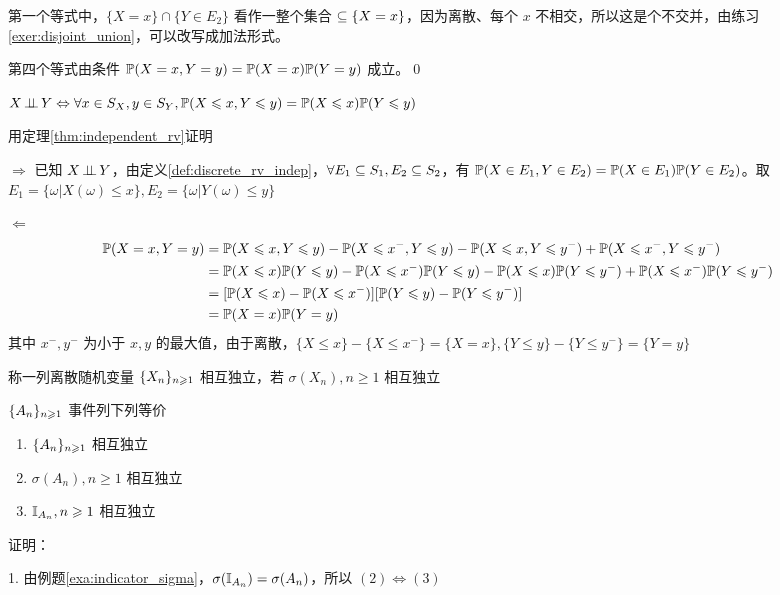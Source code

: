第一个等式中，$\{X=x\}\cap \{Y\in E_2\}$ 看作一整个集合 $\subseteq \{X=x\}$，因为离散、每个 $x$ 不相交，所以这是个不交并，由练习\ref{exer:disjoint_union}，可以改写成加法形式。

第四个等式由条件 $\mathbb{P}(X=x,Y=y)=\mathbb{P}(X=x)\mathbb{P}(Y=y)$ 成立。\qed

\begin{theorem}
    $X\operatorname{\perp\!\!\!\perp} Y\Leftrightarrow \forall x\in S_X,y\in S_Y, \mathbb{P}(X\leqslant x,Y\leqslant y)=\mathbb{P}(X\leqslant x)\mathbb{P}(Y\leqslant y)$
\end{theorem}

用定理\ref{thm:independent_rv}证明

$\Rightarrow$ 已知 $X\operatorname{\perp\!\!\!\perp} Y$，由定义\ref{def:discrete_rv_indep}，$\forall E_1\subseteq S_1,E_2\subseteq S_2$，有 $\mathbb{P}(X\in E_1,Y\in E_2)=\mathbb{P}(X\in E_1)\mathbb{P}(Y\in E_2)$。取 $E_1=\{\omega|X(\omega)\leq x\}, E_2=\{\omega|Y(\omega)\leq y\}$

$\Leftarrow$
\[
\begin{aligned}
    \mathbb{P}(X=x,Y=y)&=\mathbb{P}(X\leqslant x,Y\leqslant y)-\mathbb{P}(X\leqslant x^-,Y\leqslant y)-\mathbb{P}(X\leqslant x,Y\leqslant y^-)+\mathbb{P}(X\leqslant x^-,Y\leqslant y^-)\\
    &=\mathbb{P}(X\leqslant x)\mathbb{P}(Y\leqslant y)-\mathbb{P}(X\leqslant x^-)\mathbb{P}(Y\leqslant y)-\mathbb{P}(X\leqslant x)\mathbb{P}(Y\leqslant y^-)+\mathbb{P}(X\leqslant x^-)\mathbb{P}(Y\leqslant y^-)\\
    &=[\mathbb{P}(X\leqslant x)-\mathbb{P}(X\leqslant x^-)][\mathbb{P}(Y\leqslant y)-\mathbb{P}(Y\leqslant y^-)]\\
    &=\mathbb{P}(X=x)\mathbb{P}(Y=y)
\end{aligned}
\]
其中 $x^-,y^-$ 为小于 $x,y$ 的最大值，由于离散，$\{X\leq x\}-\{X\leq x^-\}=\{X=x\}, \{Y\leq y\}-\{Y\leq y^-\}=\{Y=y\}$

\begin{definition}
    称一列离散随机变量 $\{{X}_{n}\}_{n \geqslant 1}$ 相互独立，若 $\sigma(X_n), n\geq 1$ 相互独立
\end{definition}

\begin{theorem}
    $\{{A}_{n}\}_{n \geqslant 1}$ 事件列下列等价
    \begin{enumerate}
        \item $\{{A}_{n}\}_{n \geqslant 1}$ 相互独立
        \item $\sigma(A_n), n\geq 1$ 相互独立
        \item $\mathbb I_{A_n}, n\geqslant 1$ 相互独立
    \end{enumerate}
\end{theorem}

证明：

1. 由例题\ref{exa:indicator_sigma}，$\sigma(\mathbb I_{A_n})=\sigma(A_n)$，所以 $(2)\Leftrightarrow (3)$

